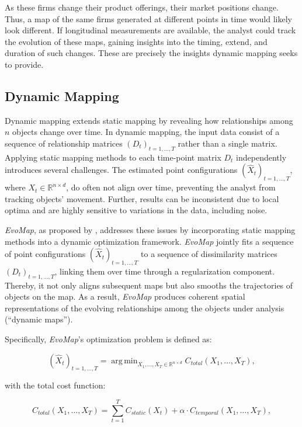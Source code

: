 \documentclass[article]{jss}
\DeclareMathOperator*{\argmin}{arg\,min}  %
\begin{document}
As these firms change their product offerings, their market positions change. Thus, a map of the same firms generated 
at different points in time would likely look different. If longitudinal measurements are
available, the analyst could track the evolution of these maps, gaining insights into the timing, extend, and 
duration of such changes. These are precisely the insights dynamic mapping seeks to provide.

\subsection{Dynamic Mapping} \label{sec:dynamic-mapping}

Dynamic mapping extends static mapping by revealing how relationships among $n$ objects change over time. 
In dynamic mapping, the input data consist of a sequence of relationship matrices $(D_t)_{t=1, \dots, T}$
 rather than a single matrix.  
Applying static mapping methods to each time-point matrix $D_t$ independently introduces several challenges. 
The estimated point configurations $(\hat{X}_t)_{t=1, \dots, T}$, where $X_t \in \mathbb{R}^{n \times d}$, do 
often not align over time, preventing the analyst from tracking objects' movement. 
Further, results can be inconsistent due to local optima and are highly sensitive to 
variations in the data, including noise.

\emph{EvoMap}, as proposed by \cite{Matthe+Ringel+Skiera:2023}, addresses these issues 
by incorporating static mapping methods into a dynamic optimization framework. 
\emph{EvoMap} jointly fits a sequence of point configurations $(\hat{X}_t)_{t=1,\dots,T}$
to a sequence of dissimilarity matrices $(D_t)_{t=1,\dots,T}$, linking them over time 
through a regularization component. Thereby, it not only aligns subsequent maps 
but also smooths the trajectories of objects on the map. As a result, 
 \emph{EvoMap} produces coherent spatial representations of the evolving relationships 
 among the objects under analysis (“dynamic maps”).

Specifically, \emph{EvoMap}’s optimization problem is defined as:

\begin{equation} \label{eq:evomap-optim}
  (\hat{X}_t)_{t=1,\ldots,T} = \argmin_{X_1, \ldots, X_T \in \mathbb{R}^{n \times d}} C_{total}(X_1, \ldots, X_T),
\end{equation}

with the total cost function:

\begin{equation} \label{eq:cost-total}
  C_{total}(X_1, \ldots, X_T) = \sum_{t=1}^T{C_{static}(X_t)} + \alpha \cdot C_{temporal}(X_1, \ldots, X_T),
\end{equation}
\end{document}
